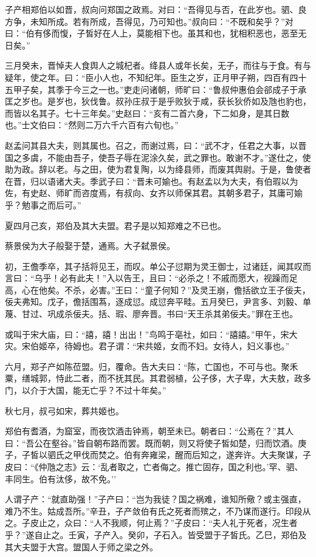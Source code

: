 \documentclass[]{article}
\begin{document}
子产相郑伯以如晋，叔向问郑国之政焉。对曰：``吾得见与否，在此岁也。驷、良方争，未知所成。若有所成，吾得见，乃可知也。''叔向曰：``不既和矣乎？''对曰：``伯有侈而愎，子皙好在人上，莫能相下也。虽其和也，犹相积恶也，恶至无日矣。''

三月癸未，晋悼夫人食舆人之城杞者。绛县人或年长矣，无子，而往与于食。有与疑年，使之年。曰：``臣小人也，不知纪年。臣生之岁，正月甲子朔，四百有四十五甲子矣，其季于今三之一也。''吏走问诸朝，师旷曰：``鲁叔仲惠伯会郤成子于承匡之岁也。是岁也，狄伐鲁。叔孙庄叔于是乎败狄于咸，获长狄侨如及虺也豹也，而皆以名其子。七十三年矣。''史赵曰：``亥有二首六身，下二如身，是其日数也。''士文伯曰：``然则二万六千六百有六旬也。''

赵孟问其县大夫，则其属也。召之，而谢过焉，曰：``武不才，任君之大事，以晋国之多虞，不能由吾子，使吾子辱在泥涂久矣，武之罪也。敢谢不才。''遂仕之，使助为政。辞以老。与之田，使为君复陶，以为绛县师，而废其舆尉。于是，鲁使者在晋，归以语诸大夫。季武子曰：``晋未可媮也。有赵孟以为大夫，有伯瑕以为佐，有史赵、师旷而咨度焉，有叔向、女齐以师保其君。其朝多君子，其庸可媮乎？勉事之而后可。''

夏四月己亥，郑伯及其大夫盟。君子是以知郑难之不已也。

蔡景侯为大子般娶于楚，通焉。大子弑景侯。

初，王儋季卒，其子括将见王，而叹。单公子愆期为灵王御士，过诸廷，闻其叹而言曰：``乌乎！必有此夫！''入以告王，且曰：``必杀之！不戚而愿大，视躁而足高，心在他矣。不杀，必害。''王曰：``童子何知？''及灵王崩，儋括欲立王子佞夫，佞夫弗知。戊子，儋括围蒍，逐成愆。成愆奔平畦。五月癸巳，尹言多、刘毅、单蔑、甘过、巩成杀佞夫。括、瑕、廖奔晋。书曰``天王杀其弟佞夫。''罪在王也。

或叫于宋大庙，曰：``譆，譆！出出！''鸟鸣于亳社，如曰：``譆譆。''甲午，宋大灾。宋伯姬卒，待姆也。君子谓：``宋共姬，女而不妇。女待人，妇义事也。''

六月，郑子产如陈莅盟。归，覆命。告大夫曰：``陈，亡国也，不可与也。聚禾粟，缮城郭，恃此二者，而不抚其民。其君弱植，公子侈，大子卑，大夫敖，政多门，以介于大国，能无亡乎？不过十年矣。''

秋七月，叔弓如宋，葬共姬也。

郑伯有耆酒，为窟室，而夜饮酒击钟焉，朝至未已。朝者曰：``公焉在？''其人曰：``吾公在壑谷。''皆自朝布路而罢。既而朝，则又将使子皙如楚，归而饮酒。庚子，子皙以驷氏之甲伐而焚之。伯有奔雍梁，醒而后知之，遂奔许。大夫聚谋，子皮曰：``《仲虺之志》云：`乱者取之，亡者侮之。推亡固存，国之利也。'罕、驷、丰同生。伯有汰侈，故不免。''

人谓子产：``就直助强！''子产曰：``岂为我徒？国之祸难，谁知所儆？或主强直，难乃不生。姑成吾所。''辛丑，子产敛伯有氏之死者而殡之，不乃谋而遂行。印段从之。子皮止之，众曰：``人不我顺，何止焉？''子皮曰：``夫人礼于死者，况生者乎？''遂自止之。壬寅，子产入。癸卯，子石入。皆受盟于子皙氏。乙巳，郑伯及其大夫盟于大宫。盟国人于师之梁之外。
\end{document}
